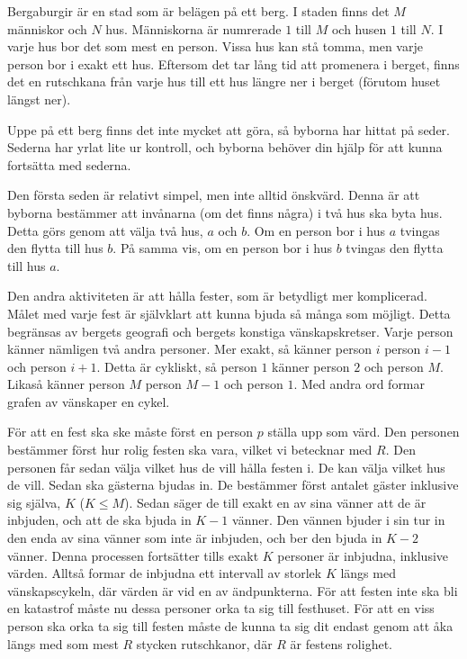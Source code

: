Bergaburgir är en stad som är belägen på ett berg.
I staden finns det $M$ människor och $N$ hus.
Människorna är numrerade $1$ till $M$ och husen $1$ till $N$.
I varje hus bor det som mest en person.
Vissa hus kan stå tomma, men varje person bor i exakt ett hus.
Eftersom det tar lång tid att promenera i berget, finns det en rutschkana från varje hus till ett hus längre ner i berget (förutom huset längst ner).

Uppe på ett berg finns det inte mycket att göra, så byborna har hittat på seder.
Sederna har yrlat lite ur kontroll, och byborna behöver din hjälp för att kunna fortsätta med sederna.

Den första seden är relativt simpel, men inte alltid önskvärd.
Denna är att byborna bestämmer att invånarna (om det finns några) i två hus ska byta hus.
Detta görs genom att välja två hus, $a$ och $b$.
Om en person bor i hus $a$ tvingas den flytta till hus $b$.
På samma vis, om en person bor i hus $b$ tvingas den flytta till hus $a$.

Den andra aktiviteten är att hålla fester, som är betydligt mer komplicerad.
Målet med varje fest är självklart att kunna bjuda så många som möjligt.
Detta begränsas av bergets geografi och bergets konstiga vänskapskretser.
Varje person känner nämligen två andra personer.
Mer exakt, så känner person $i$ person $i-1$ och person $i+1$.
Detta är cykliskt, så person $1$ känner person $2$ och person $M$.
Likaså känner person $M$ person $M-1$ och person $1$.
Med andra ord formar grafen av vänskaper en cykel.

För att en fest ska ske måste först en person $p$ ställa upp som värd.
Den personen bestämmer först hur rolig festen ska vara, vilket vi betecknar med $R$.
Den personen får sedan välja vilket hus de vill hålla festen i.
De kan välja vilket hus de vill.
Sedan ska gästerna bjudas in.
De bestämmer först antalet gäster inklusive sig själva, $K$ ($K \leq M$).
Sedan säger de till exakt en av sina vänner att de är inbjuden, och att de ska bjuda in $K-1$ vänner.
Den vännen bjuder i sin tur in den enda av sina vänner som inte är inbjuden, och ber den bjuda in $K-2$ vänner.
Denna processen fortsätter tills exakt $K$ personer är inbjudna, inklusive värden.
Alltså formar de inbjudna ett intervall av storlek $K$ längs med vänskapscykeln, där värden är vid en av ändpunkterna.
För att festen inte ska bli en katastrof måste nu dessa personer orka ta sig till festhuset.
För att en viss person ska orka ta sig till festen måste de kunna ta sig dit endast genom att åka längs
med som mest $R$ stycken rutschkanor, där $R$ är festens rolighet.

